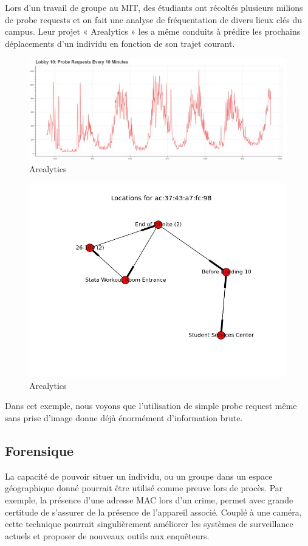 Lors d’un travail de groupe au MIT, des étudiants ont récoltés plusieurs milions de probe requests et on fait une
analyse de fréquentation de divers lieux clés du campus. Leur projet « Arealytics » les a même conduits à prédire
les prochains déplacements d’un individu en fonction de son trajet courant.
\begin{figure}[H]
	\centering
	\includegraphics[width=16cm]{images/etude-legi-1.jpg}
	\caption{Arealytics}
	\label{fig:arealytics}
\end{figure}
\begin{figure}[H]
	\centering
	\includegraphics[width=12cm]{images/etude-legi-2.jpg}
	\caption{Arealytics}
	\label{fig:prediction de chemins à l'aide de probe}
\end{figure}

Dans cet exemple, nous voyons que l’utilisation de simple probe request même sans prise d’image donne déjà
énormément d’information brute.

\subsection{Forensique}
La capacité de pouvoir situer un individu, ou un groupe dans un espace géographique donné pourrait être utilisé
comme preuve lors de procès. Par exemple, la présence d’une adresse MAC lors d’un crime, permet avec grande
certitude de s’assurer de la présence de l’appareil associé. Couplé à une caméra, cette technique pourrait
singulièrement améliorer les systèmes de surveillance actuels et proposer de nouveaux outils aux enquêteurs.

